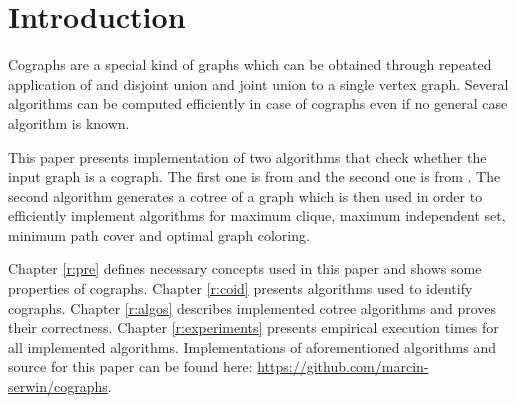 
\chapter*{Introduction}

Cographs are a special kind of graphs which can be obtained through repeated application of and disjoint union and joint union to a single vertex graph. Several algorithms can be computed efficiently in case of cographs even if no general case algorithm is known.

This paper presents implementation of two algorithms that check whether the input graph is a cograph. The first one is from \cite{habib} and the second one is from \cite{corneil}. The second algorithm generates a cotree of a graph which is then used in order to efficiently implement algorithms for maximum clique, maximum independent set, minimum path cover and optimal graph coloring.

Chapter \ref{r:pre} defines necessary concepts used in this paper and shows some properties of cographs. Chapter \ref{r:coid} presents algorithms used to identify cographs. Chapter \ref{r:algos} describes implemented cotree algorithms and proves their correctness. Chapter \ref{r:experiments} presents empirical execution times for all implemented algorithms. Implementations of aforementioned algorithms and source for this paper can be found here: \url{https://github.com/marcin-serwin/cographs}.

